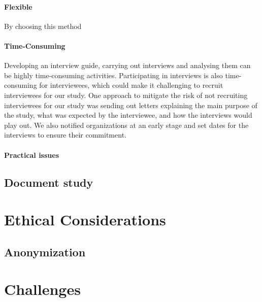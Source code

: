 \paragraph{Flexible} By choosing this method
\paragraph{Time-Consuming} Developing an interview guide, carrying out interviews and analysing them can be highly time-consuming activities. Participating in interviews is also time-consuming for interviewees, which could make it challenging to recruit interviewees for our study. One approach to mitigate the risk of not recruiting interviewees for our study was sending out letters explaining the main purpose of the study, what was expected by the interviewee, and how the interviews would play out. We also notified organizations at an early stage and set dates for the interviews to ensure their commitment.
\paragraph{Practical issues}
\subsection{Document study}
\section{Ethical Considerations}
\subsection{Anonymization}
\section{Challenges}

